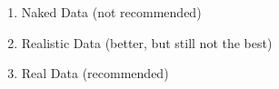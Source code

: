 \begin{description}
\vspace{.3in}
\item[\allcaps{\textbf{Appendix D: Examples of Naked, Realistic, and Real Data}}] \hfill
	\vspace{-.2in}
	\begin{enumerate}[leftmargin=1cm, itemsep=.2em]
	\item Naked Data (not recommended)
	\item Realistic Data (better, but still not the best)
	\item Real Data (recommended)
	\end{enumerate} 
\end{description}


